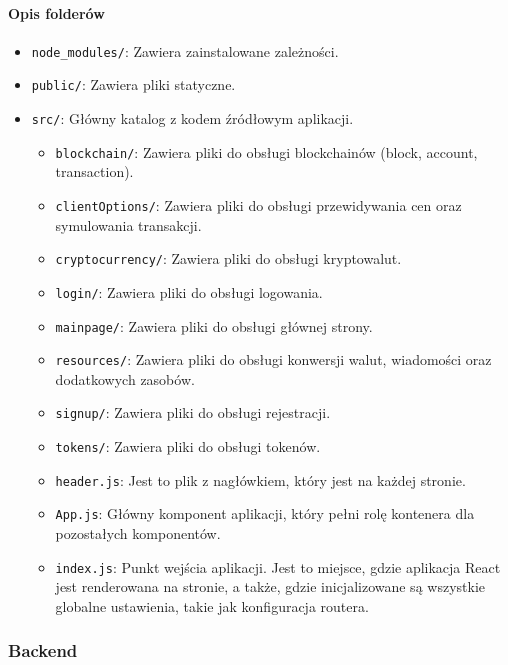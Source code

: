 \paragraph{Opis folderów}
\begin{itemize}
    \item \texttt{node\_modules/}: Zawiera zainstalowane zależności.
    \item \texttt{public/}: Zawiera pliki statyczne.
    \item \texttt{src/}: Główny katalog z kodem źródłowym aplikacji.
    \begin{itemize}
        \item \texttt{blockchain/}: Zawiera pliki do obsługi blockchainów (block, account, transaction).
        \item \texttt{clientOptions/}: Zawiera pliki do obsługi przewidywania cen oraz symulowania transakcji.
        \item \texttt{cryptocurrency/}: Zawiera pliki do obsługi kryptowalut.
        \item \texttt{login/}: Zawiera pliki do obsługi logowania.
        \item \texttt{mainpage/}: Zawiera pliki do obsługi głównej strony.
        \item \texttt{resources/}: Zawiera pliki do obsługi konwersji walut, wiadomości oraz dodatkowych zasobów.
        \item \texttt{signup/}: Zawiera pliki do obsługi rejestracji.
        \item \texttt{tokens/}: Zawiera pliki do obsługi tokenów.
        \item \texttt{header.js}: Jest to plik z nagłówkiem, który jest na każdej stronie.
        \item \texttt{App.js}: Główny komponent aplikacji, który pełni rolę kontenera dla pozostałych komponentów.
        \item \texttt{index.js}: Punkt wejścia aplikacji. Jest to miejsce, gdzie aplikacja React jest renderowana na stronie, a także, gdzie inicjalizowane są wszystkie globalne ustawienia, takie jak konfiguracja routera.
    \end{itemize}
\end{itemize}

\subsubsection{Backend}
